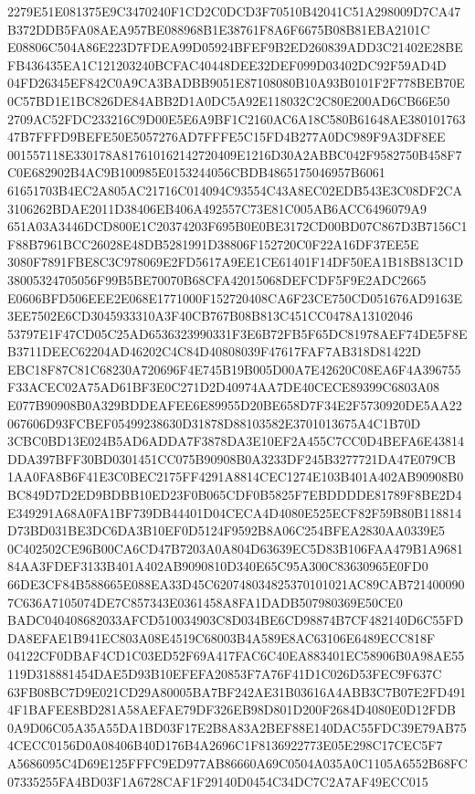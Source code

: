 \documentclass[UTF8,fontset=fandol,zihao=-4,a4paper]{ctexart}
\begin{document}
{{2279E51E081375E9C3470240F1CD2C0DCD3F70510B42041C51A298009D7CA47B372DDB5FA08AEA957BE088968B1E38761F8A6F6675B08B81EBA2101C
E08806C504A86E223D7FDEA99D05924BFEF9B2ED260839ADD3C21402E28BEFB436435EA1C121203240BCFAC40448DEE32DEF099D03402DC92F59AD4D
04FD26345EF842C0A9CA3BADBB9051E87108080B10A93B0101F2F778BEB70E0C57BD1E1BC826DE84ABB2D1A0DC5A92E118032C2C80E200AD6CB66E50
2709AC52FDC233216C9D00E5E6A9BF1C2160AC6A18C580B61648AE38010176347B7FFFD9BEFE50E5057276AD7FFFE5C15FD4B277A0DC989F9A3DF8EE
001557118E330178A817610162142720409E1216D30A2ABBC042F9582750B458F7C0E682902B4AC9B100985E0153244056CBDB4865175046957B6061
61651703B4EC2A805AC21716C014094C93554C43A8EC02EDB543E3C08DF2CA3106262BDAE2011D38406EB406A492557C73E81C005AB6ACC6496079A9
651A03A3446DCD800E1C20374203F695B0E0BE3172CD00BD07C867D3B7156C1F88B7961BCC26028E48DB5281991D38806F152720C0F22A16DF37EE5E
3080F7891FBE8C3C978069E2FD5617A9EE1CE61401F14DF50EA1B18B813C1D38005324705056F99B5BE70070B68CFA42015068DEFCDF5F9E2ADC2665
E0606BFD506EEE2E068E1771000F152720408CA6F23CE750CD051676AD9163E3EE7502E6CD3045933310A3F40CB767B08B813C451CC0478A13102046
53797E1F47CD05C25AD6536323990331F3E6B72FB5F65DC81978AEF74DE5F8EB3711DEEC62204AD46202C4C84D40808039F47617FAF7AB318D81422D
EBC18F87C81C68230A720696F4E745B19B005D00A7E42620C08EA6F4A396755F33ACEC02A75AD61BF3E0C271D2D40974AA7DE40CECE89399C6803A08
E077B90908B0A329BDDEAFEE6E89955D20BE658D7F34E2F5730920DE5AA22067606D93FCBEF05499238630D31878D88103582E3701013675A4C1B70D
3CBC0BD13E024B5AD6ADDA7F3878DA3E10EF2A455C7CC0D4BEFA6E43814DDA397BFF30BD0301451CC075B90908B0A3233DF245B3277721DA47E079CB
1AA0FA8B6F41E3C0BEC2175FF4291A8814CEC1274E103B401A402AB90908B0BC849D7D2ED9BDBB10ED23F0B065CDF0B5825F7EBDDDDE81789F8BE2D4
E349291A68A0FA1BF739DB44401D04CECA4D4080E525ECF82F59B80B118814D73BD031BE3DC6DA3B10EF0D5124F9592B8A06C254BFEA2830AA0339E5
0C402502CE96B00CA6CD47B7203A0A804D63639EC5D83B106FAA479B1A968184AA3FDEF3133B401A402AB9090810D340E65C95A300C83630965E0FD0
66DE3CF84B588665E088EA33D45C620748034825370101021AC89CAB7214000907C636A7105074DE7C857343E0361458A8FA1DADB507980369E50CE0
BADC040408682033AFCD510034903C8D034BE6CD98874B7CF482140D6C55FDDA8EFAE1B941EC803A08E4519C68003B4A589E8AC63106E6489ECC818F
04122CF0DBAF4CD1C03ED52F69A417FAC6C40EA883401EC58906B0A98AE55119D318881454DAE5D93B10EFEFA20853F7A76F41D1C026D53FEC9F637C
63FB08BC7D9E021CD29A80005BA7BF242AE31B03616A4ABB3C7B07E2FD4914F1BAFEE8BD281A58AEFAE79DF326EB98D801D200F2684D4080E0D12FDB
0A9D06C05A35A55DA1BD03F17E2B8A83A2BEF88E140DAC55FDC39E79AB754CECC0156D0A08406B40D176B4A2696C1F8136922773E05E298C17CEC5F7
A5686095C4D69E125FFFC9ED977AB86660A69C0504A035A0C1105A6552B68FC07335255FA4BD03F1A6728CAF1F29140D0454C34DC7C2A7AF49ECC015
}}
\end{document}
